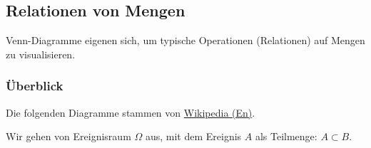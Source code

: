 \documentclass[
  a4paper,
  DIV=11]{scrreprt}
\theoremstyle{definition}
\theoremstyle{remark}
\begin{document}
\hypertarget{relationen-von-mengen}{%
\subsection{Relationen von Mengen}\label{relationen-von-mengen}}

Venn-Diagramme eigenen sich, um typische Operationen (Relationen) auf
Mengen zu visualisieren.

\hypertarget{uxfcberblick}{%
\subsubsection{Überblick}\label{uxfcberblick}}

Die folgenden Diagramme stammen von
\href{https://en.wikipedia.org/wiki/Venn_diagram}{Wikipedia (En)}.

Wir gehen von Ereignisraum \(\Omega\) aus, mit dem Ereignis \(A\) als
Teilmenge: \(A \subset B\).
\end{document}
